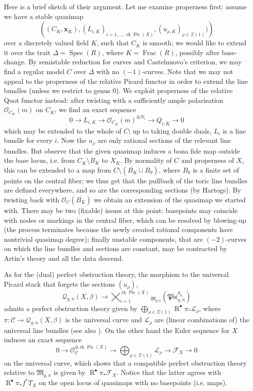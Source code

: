 \documentclass[11pt]{amsart}
\newcommand{\Q}[4]{\mathcal{Q}_{#1,#2}(#3,#4)}
\newcommand{\OO}{\mathcal{O}}
\renewcommand{\to}{\rightarrow}
\newcommand{\MM}{\mathfrak M}
\newcommand{\Pic}{\operatorname{Pic}}
\newcommand{\Spec}{\operatorname{Spec}}
\newcommand{\rk}{\operatorname{rk}}
\newcommand{\dvr}{\Delta}
\theoremstyle{definition}
\theoremstyle{definition}
\begin{document}
Here is a brief sketch of their argument. Let me examine properness first: assume we have a stable quasimap \[\left((C_K,\mathbf x_K), (L_{i,K})_{i=1,\ldots,\rk\Pic(X)},(u_{\rho,K})_{\rho\in\Sigma(1)})\right)\] over a discretely valued field $K$, such that $C_K$ is smooth; we would like to extend it over the trait $\dvr=\Spec(R)$, where $K=\operatorname{Frac}(R)$, possibly after base-change. By semistable reduction for curves and Castelnuovo's criterion, we may find a regular model $C$ over $\dvr$ with no $(-1)$-curves. Note that we may not appeal to the properness of the relative Picard functor in order to extend the line bundles (unless we restrict to genus $0$). We exploit properness of the relative Quot functor instead: after twisting with a sufficiently ample polarisation $\OO_{C_K}(m)$ on $C_K$, we find an exact sequence
\[ 0 \to L_{i,K} \to \OO_{C_K}(m)^{\oplus N_i} \to Q_{i,K}\to 0 \]
which may be extended to the whole of $C$; up to taking double duals, $L_i$ is a line bundle for every $i$. Now the $u_\rho$ are only rational sections of the relevant line bundles. But observe that the given quasimap induces a bona fide map outside the base locus, i.e. from $C_K\setminus B_K$ to $X_K$. By normality of $C$ and properness of $X$, this can be extended to a map from $C\setminus(\overline{B_K}\cup B_0)$, where $B_0$ is a finite set of points on the central fiber; we thus get that the pullback of the toric line bundles are defined everywhere, and so are the corresponding sections (by Hartogs). By twisting back with $\OO_C(\overline{B_K})$ we obtain an extension of the quasimap we started with. There may be two (fixable) issues at this point: basepoints may coincide with nodes or markings in the central fiber, which can be resolved by blowing-up (the process terminates because the newly created rational components have nontrivial quasimap degree); finally unstable components, that are $(-2)$-curves on which the line bundles and sections are constant, may be contracted by Artin's theory and all the data descend.

As for the (dual) perfect obstruction theory, the morphism to the universal Picard stack that forgets the sections $(u_\rho)$,
\[\Q{g}{n}{X}{\beta} \to \bigtimes_{i=1}^{\rk\Pic(X)}{}_{\MM_{g,n}}\left(\mathfrak{Pic}^{d_{\rho_i}}_{g,n}\right)\]
admits a perfect obstruction theory given by $\bigoplus_{\rho\in\Sigma(1)} \operatorname R^\bullet\pi_*\mathcal L_\rho$, where $\pi\colon \mathcal C\to \Q{g}{n}{X}{\beta}$ is the universal curve and $\mathcal L_\rho$ are (linear combinations of) the universal line bundles (see also \cite{Jie, CL-pfields}). On the other hand the Euler sequence for $X$ induces an exact sequence
\[ 0\to \OO_{\mathcal C}^{\oplus\rk\Pic(X)}\to \bigoplus_{\rho\in\Sigma(1)}\mathcal L_\rho\to\mathcal F_X\to 0\]
on the universal curve, which shows that a compatible perfect obstruction theory relative to $\MM_{g,n}$ is given by $\operatorname R^\bullet\pi_*\mathcal F_X$. Notice that the latter agrees with $\operatorname R^\bullet\pi_*f^*T_X$ on the open locus of quasimaps with no basepoints (i.e. maps).
\end{document}
